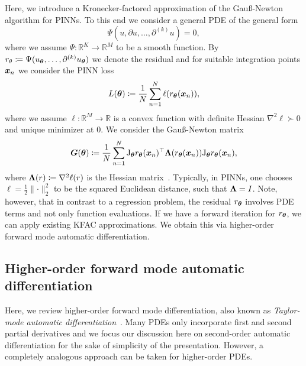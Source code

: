 Here, we introduce a Kronecker-factored approximation of the Gauß-Newton algorithm for PINNs. 
To this end we consider a general PDE of the general form 
\begin{equation}
    \Psi(u, \partial u, \dots, \partial^{(k)} u) = 0,
\end{equation}
where we assume $\Psi\colon \mathbb R^K\to\mathbb R^M$ to be a smooth function.
By $r_\theta\coloneqq \Psi(u_{\bm{\theta}}, \dots, \partial^{(k)} u_{\bm{\theta}})$ we denote the residual and for suitable integration points ${\bm{x}}_n$ we consider the PINN loss
\begin{equation}
    L({\bm{\theta}})\coloneqq \frac1N\sum_{n=1}^N \ell(r_{{\bm{\theta}}}({\bm{x}}_n)),
\end{equation}
where we assume $\ell\colon\mathbb R^M\to\mathbb R$ is a convex function with definite Hessian $\nabla^2\ell\succ0$ and unique minimizer at $0$. 
We consider the Gauß-Newton matrix
\begin{equation}
    {\bm{G}}({\bm{\theta}}) \coloneqq \frac1N\sum_{n=1}^N \mathrm{J}_{\bm{\theta}} r_{\bm{\theta}}({\bm{x}}_n)^\top {\bm{\Lambda}}(r_{\bm{\theta}}({\bm{x}}_n)) \mathrm{J}_{\bm{\theta}} r_{\bm{\theta}}({\bm{x}}_n),
\end{equation}
where ${\bm{\Lambda}}(r)\coloneqq \nabla^2 \ell(r)$ is the Hessian matrix~\citep{eschenhagen2023kroneckerfactored}. 
Typically, in PINNs, one chooses $\ell = \frac12\lVert \cdot \rVert_2^2$ to be the squared Euclidean distance, such that ${\bm{\Lambda}} = I$. 
Note, however, that in contrast to a regression problem, the residual $r_{\bm{\theta}}$ involves PDE terms and not only function evaluations. 
If we have a forward iteration for $r_{\bm{\theta}}$, we can apply existing KFAC approximations. 
We obtain this via higher-order forward mode automatic differentiation. 

\subsection{Higher-order forward mode automatic differentiation}
\label{sec:taylor-mode-AD}

Here, we review higher-order forward mode differentiation, also known as \emph{Taylor-mode automatic differentiation}~\citep{griewank1996algorithm, griewank2008evaluating, bettencourt2019taylor}. 
Many PDEs only incorporate first and second partial derivatives and we focus our discussion here on second-order automatic differentiation for the sake of simplicity of the presentation. 
However, a completely analogous approach can be taken for higher-order PDEs. 

